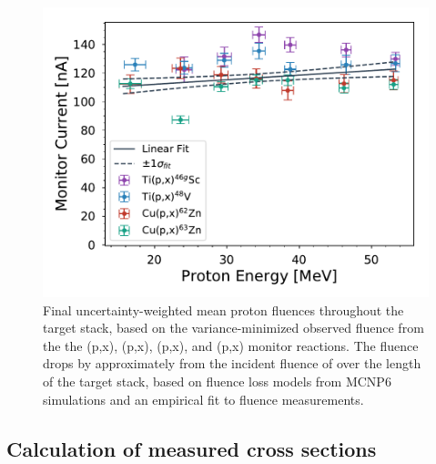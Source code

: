 \begin{figure}
 \centering
 \includegraphics[width=0.5\linewidth]{./figures/current_norm_az.pdf}
 \caption{ Final uncertainty-weighted mean proton fluences throughout the target stack, based on the variance-minimized observed fluence from the the  (p,x), (p,x), (p,x), and (p,x) monitor reactions. 
  The fluence  drops by approximately  from the incident fluence of  over the length of the target stack, based on fluence loss models from MCNP6 simulations and an empirical fit to  fluence measurements.}  
 \label{fig:fe_fluence_plot}
\end{figure}






\subsection{\label{sec:calcs_sec_fe}Calculation of measured cross sections}


